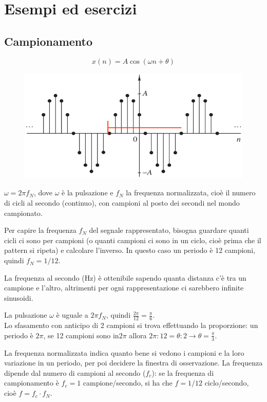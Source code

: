 \section{Esempi ed esercizi}


\subsection{Campionamento}
$$x(n) = A\cos(\omega n + \theta)$$
\begin{figure}[h]
	\centering
	\includegraphics[scale=0.56]{Lezioni/Immagini/esempio1}
\end{figure}

$\omega = 2\pi f_N$, dove $\omega$ è la pulsazione e $f_N$ la frequenza normalizzata, cioè il numero di cicli al secondo (continuo), con campioni al posto dei secondi nel mondo campionato.

Per capire la frequenza $f_N$ del segnale rappresentato, bisogna guardare quanti cicli ci sono per campioni (o quanti campioni ci sono in un ciclo, cioè prima che il pattern si ripeta) e calcolare l'inverso. In questo caso un periodo è 12 campioni, quindi $f_N = 1/12$.

La frequenza al secondo (Hz) è ottenibile sapendo quanta distanza c'è tra un campione e l'altro, altrimenti per ogni rappresentazione ci sarebbero infinite sinusoidi.

La pulsazione $\omega$ è uguale a $2\pi f_N$, quindi $\frac{2\pi}{12} = \frac{\pi}{6}$. \\
Lo sfasamento con anticipo di 2 campioni si trova effettuando la proporzione: un periodo è $2\pi$, se 12 campioni sono in$2\pi$ allora $2\pi : 12 = \theta : 2 \rightarrow \theta = \frac{\pi}{3}$.

La frequenza normalizzata indica quanto bene si vedono i campioni e la loro variazione in un periodo, per poi decidere la finestra di osservazione. La frequenza dipende dal numero di campioni al secondo ($f_c$): se la frequenza di campionamento è $f_c = 1$ campione/secondo, si ha che $f = 1/12$ ciclo/secondo, cioè $f = f_c \cdot f_N$.

